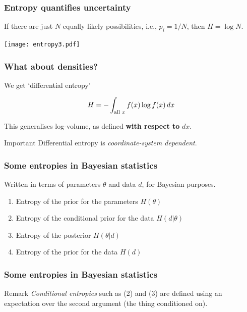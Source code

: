 \documentclass{beamer}
\begin{document}
\begin{frame}
\frametitle{Entropy quantifies uncertainty}
If there are just $N$ equally likely possibilities,
i.e., $p_i = 1/N$, then $H = \log N$. \vspace{0.5em}

\begin{center}
\texttt{[image: entropy3.pdf]}
\end{center}

\end{frame}


\begin{frame}
\frametitle{What about densities?}
We get `differential entropy'

\begin{align}
H = - \int_{\textnormal{all }x} f(x) \log f(x) \, dx
\end{align}

This generalises log-volume, as defined {\bf with respect to} $dx$.
\pause
\begin{alertblock}{Important}
Differential entropy is {\em coordinate-system dependent}.
\end{alertblock}

\end{frame}






\begin{frame}
\frametitle{Some entropies in Bayesian statistics}
Written in terms of parameters $\theta$ and data
$d$, for Bayesian purposes.

\begin{enumerate}
\item<2-> Entropy of the prior for the parameters $H(\theta)$
\item<3-> Entropy of the conditional prior for the data $H(d | \theta)$
\item<4-> Entropy of the posterior $H(\theta | d)$
\item<5-> Entropy of the prior for the data $H(d)$
\end{enumerate}

\end{frame}


\begin{frame}
\frametitle{Some entropies in Bayesian statistics}

\begin{block}{Remark}
{\em Conditional entropies} such as (2) and (3)
are defined using an expectation over the second argument
(the thing conditioned on).
\end{block}

\end{frame}
\end{document}
